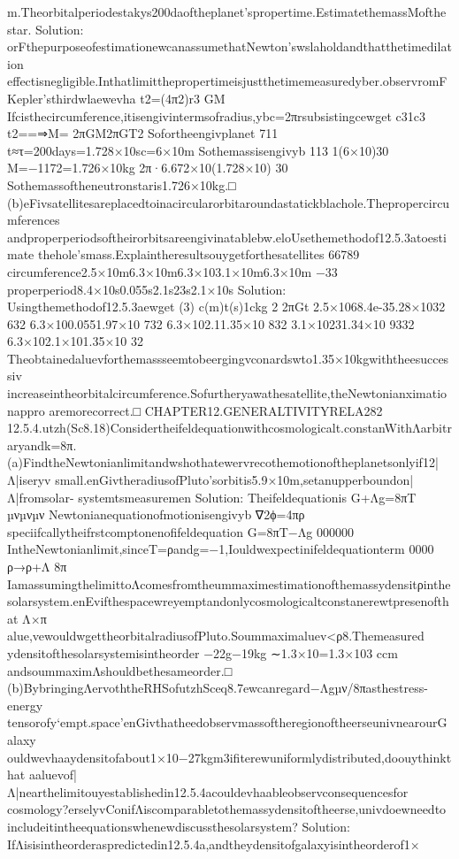 {{{{{{{{{{{{{{{{m.Theorbitalperiodestakys200daoftheplanet’spropertime.EstimatethemassMofthe
star.
Solution:
orFthepurposeofestimationewcanassumethatNewton’swslaholdandthatthetimedilation
effectisnegligible.Inthatlimitthepropertimeisjustthetimemeasuredyber.observromF
Kepler’sthirdwlaewevha
t2=(4π2)r3
GM
Ifcisthecircumference,itisengivintermsofradius,ybc=2πrsubsistingcewget
c31c3
t2==⇒M=
2πGM2πGT2
Sofortheengivplanet
711
t≈τ=200days=1.728×10sc=6×10m
Sothemassisengivyb
113
1(6×10)30
M=−1172=1.726×10kg
2π·6.672×10(1.728×10)
30
Sothemassoftheneutronstaris1.726×10kg.□
(b)eFivsatellitesareplacedtoinacircularorbitaroundastatickblachole.Thepropercircumferences
andproperperiodsoftheirorbitsareengivinatablebw.eloUsethemethodof12.5.3atoestimate
thehole’smass.Explaintheresultsouygetforthesatellites
66789
circumference2.5×10m6.3×10m6.3×103.1×10m6.3×10m
−33
properperiod8.4×10s0.055s2.1s23s2.1×10s
Solution:
Usingthemethodof12.5.3aewget
(3)
c(m)t(s)1ckg
2
2πGt
2.5×1068.4e-35.28×1032
632
6.3×100.0551.97×10
732
6.3×102.11.35×10
832
3.1×10231.34×10
9332
6.3×102.1×101.35×10
32
Theobtainedaluevforthemassseemtobeergingvconardswto1.35×10kgwiththeesuccessiv
increaseintheorbitalcircumference.Sofurtheryawathesatellite,theNewtonianximationappro
aremorecorrect.□
CHAPTER12.GENERALTIVITYRELA282
12.5.4.utzh(Sc8.18)Considertheifeldequationwithcosmologicalt.constanWithΛarbitraryandk=8π.
(a)FindtheNewtonianlimitandwshothatewervrecothemotionoftheplanetsonlyif12|Λ|iseryv
small.enGivtheradiusofPluto’sorbitis5.9×10m,setanupperboundon|Λ|fromsolar-
systemtsmeasuremen
Solution:
Theifeldequationis
G+Λg=8πT
µνµνµν
Newtonianequationofmotionisengivyb
∇2ϕ=4πρ
speciifcallytheifrstcomptonenofifeldequation
G=8πT−Λg
000000
IntheNewtonianlimit,sinceT=ρandg=−1,Iouldwexpectinifeldequationterm
0000
ρ→ρ+Λ
8π
IamassumingthelimittoΛcomesfromtheummaximestimationofthemassydensitρinthe
solarsystem.enEvifthespacewreyemptandonlycosmologicaltconstanerewtpresenofthat
Λ×π
alue,vewouldwgettheorbitalradiusofPluto.Soummaximaluev<ρ8.Themeasured
ydensitofthesolarsystemisintheorder
−22g−19kg
∼1.3×10=1.3×103
ccm
andsoummaximΛshouldbethesameorder.□
(b)BybringingΛervoththeRHSofutzhSceq8.7ewcanregard−Λgµν/8πasthestress-energy
tensorofy‘empt.space’enGivthatheedobservmassoftheregionoftheerseunivnearourGalaxy
ouldwevhaaydensitofabout1×10−27kgm3ifiterewuniformlydistributed,doouythinkthat
aaluevof|Λ|nearthelimitouyestablishedin12.5.4acouldevhaableobservconsequencesfor
cosmology?erselyvConifΛiscomparabletothemassydensitoftheerse,univdoewneedto
includeitintheequationswhenewdiscussthesolarsystem?
Solution:
IfΛisisintheorderaspredictedin12.5.4a,andtheydensitofgalaxyisintheorderof1×
}}}}}}}}}}}}}}}}
